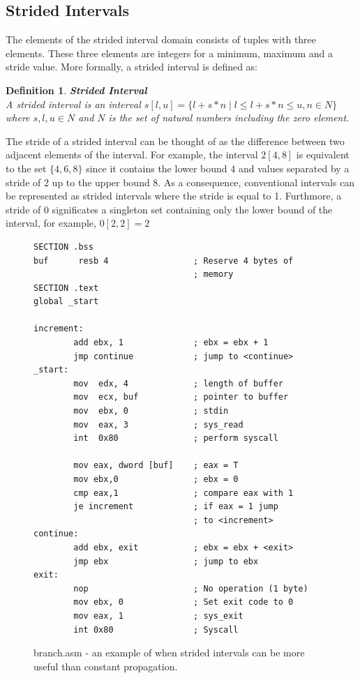 \documentclass{kththesis}
\newtheorem*{definition}{Definition}
\begin{document}
\subsection{Strided Intervals}\label{sec:absDomInt}
The elements of the strided interval domain consists of tuples with three elements. These three elements are integers for a minimum, maximum and a stride value. More formally, a strided interval is defined as: 
\begin{definition}\textbf{Strided Interval}\\
A strided interval is an interval $s[l,u] = \{l + s * n\;|\;l \leq l + s * n \leq u, n \in N \}$ where $s,l,u \in N$ and $N$ is the set of natural numbers including the zero element.
\end{definition}
\noindent The stride of a strided interval can be thought of as the difference between two adjacent elements of the interval. For example, the interval $2[4,8]$ is equivalent to the set $\{4,6,8\}$ since it contains the lower bound 4 and values separated by a stride of 2 up to the upper bound 8. As a consequence, conventional intervals can be represented as strided intervals where the stride is equal to 1. Furthmore, a stride of 0 significates a singleton set containing only the lower bound of the interval, for example, $0[2,2] = 2$
\begin{figure}[ht]
    \centering
\begin{tcolorbox}
\begin{verbatim}
SECTION .bss
buf      resb 4                 ; Reserve 4 bytes of
                                ; memory
SECTION .text
global _start

increment:
        add ebx, 1              ; ebx = ebx + 1
        jmp continue            ; jump to <continue>
_start:
        mov  edx, 4             ; length of buffer
        mov  ecx, buf           ; pointer to buffer
        mov  ebx, 0             ; stdin
        mov  eax, 3             ; sys_read
        int  0x80               ; perform syscall

        mov eax, dword [buf]    ; eax = T
        mov ebx,0               ; ebx = 0
        cmp eax,1               ; compare eax with 1
        je increment            ; if eax = 1 jump
                                ; to <increment>
continue:
        add ebx, exit           ; ebx = ebx + <exit>
        jmp ebx                 ; jump to ebx
exit:
        nop                     ; No operation (1 byte)
        mov ebx, 0              ; Set exit code to 0
        mov eax, 1              ; sys_exit
        int 0x80                ; Syscall
\end{verbatim}
\end{tcolorbox}
\caption{branch.asm - an example of when strided intervals can be more useful than constant propagation.}
    \label{fig:branch.asm}
\end{figure}
\end{document}
